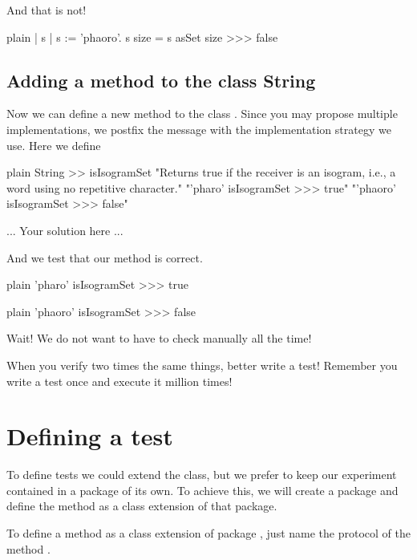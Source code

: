 \documentclass[10pt,twoside,english]{_support/latex/sbabook/sbabook}
\begin{document}
And that  is not!

\begin{displaycode}{plain}
| s | 
s := 'phaoro'.
s size = s asSet size 
>>> false
\end{displaycode}
\subsection{Adding a method to the class String}
Now we can define a new method to the class . Since you may propose multiple implementations, we postfix the message with the implementation strategy we use. Here we define 

\begin{displaycode}{plain}
String >> isIsogramSet
	"Returns true if the receiver is an isogram, i.e., a word using no repetitive character."
	"'pharo' isIsogramSet
	>>> true"
	"'phaoro' isIsogramSet
	>>> false"
	
	... Your solution here ... 
\end{displaycode}

And we test that our method is correct. 

\begin{displaycode}{plain}
'pharo' isIsogramSet 
>>> true
\end{displaycode}

\begin{displaycode}{plain}
'phaoro' isIsogramSet 
>>> false
\end{displaycode}

Wait! We do not want to have to check manually all the time!

\begin{coffee}
When you verify two times the same things, better write a test! Remember you write  a test once and execute it million times!
\end{coffee}
\section{Defining a test}
To define tests we could extend the  class, but we prefer to keep our experiment contained in a package of its own. To achieve this, we will create a package  and define the  method as a class extension of that package.

\begin{important}
To define a method as a class extension of package , just name the protocol of the method .
\end{important}
\end{document}
